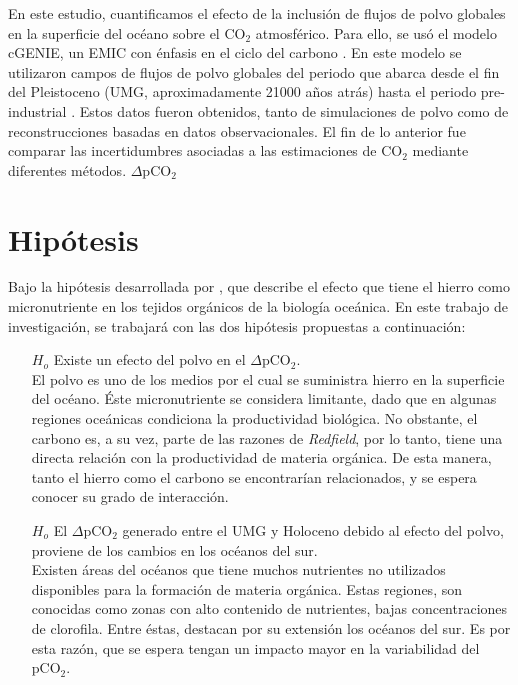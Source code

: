 En este estudio, cuantificamos el efecto de la inclusión de flujos de polvo globales en la superficie del océano sobre el CO$_2$ atmosférico. Para ello, se usó el modelo cGENIE, un EMIC con énfasis en el ciclo del carbono \citep{ridgwell2007marine}. En este modelo se utilizaron campos de flujos de polvo globales del periodo que abarca desde el fin del Pleistoceno (UMG, aproximadamente 21000 años atrás) hasta el periodo pre-industrial \citep{sigman2000glacial,lynch2007atlantic,braconnot2007results,barker2009interhemispheric}. Estos datos fueron obtenidos, tanto de simulaciones de polvo como de reconstrucciones basadas en datos observacionales. El fin de lo anterior fue comparar las incertidumbres asociadas a las estimaciones de CO$_2$ mediante diferentes métodos.
$\Delta$pCO$_{2}$
\section{Hipótesis}

Bajo la hip\'otesis desarrollada por \cite{martin1990glacial}, que describe el efecto que tiene el hierro como micronutriente en los tejidos orgánicos de la biología oceánica.
En este trabajo de investigación, se trabajará con las dos hipótesis propuestas a continuación: 
\begin{itemize}
	\item[$H_{o}$] Existe un efecto del polvo en el $\Delta$pCO$_{2}$. \\
El polvo es uno de los medios por el cual se suministra hierro en la superficie del océano. Éste micronutriente se considera limitante, dado que en algunas regiones oceánicas condiciona la productividad biológica.  No obstante, el carbono es, a su vez, parte de las razones de \textit{Redfield}, por lo tanto, tiene una directa relación con la productividad de materia orgánica. De esta manera, tanto el hierro como el carbono se encontrarían relacionados, y se espera conocer su grado de interacción. 
\item[$H_{o}$] El $\Delta$pCO$_{2}$ generado entre el UMG y Holoceno debido al efecto del polvo, proviene de los cambios en los océanos del sur. \\
Existen áreas del océanos que tiene muchos nutrientes no utilizados disponibles para la formación de materia orgánica. Estas regiones, son conocidas como zonas con alto contenido de nutrientes, bajas concentraciones de clorofila. Entre éstas, destacan por su extensión los océanos del sur. Es por esta razón, que se espera tengan un impacto mayor en la variabilidad del pCO$_2$.  
	\end{itemize} 

